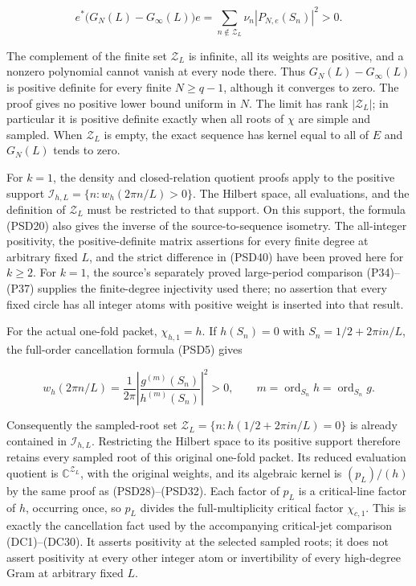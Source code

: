 \[
e^*\bigl(G_N(L)-G_\infty(L)\bigr)e
=\sum_{n\notin\mathcal Z_L}\nu_n|P_{N,e}(S_n)|^2>0.
\tag{PSD40}
\]

The complement of the finite set \(\mathcal Z_L\) is infinite, all its weights are positive, and a nonzero polynomial cannot vanish at every node there. Thus \(G_N(L)-G_\infty(L)\) is positive definite for every finite \(N\ge q-1\), although it converges to zero. The proof gives no positive lower bound uniform in \(N\). The limit has rank \(|\mathcal Z_L|\); in particular it is positive definite exactly when all roots of \(\chi\) are simple and sampled. When \(\mathcal Z_L\) is empty, the exact sequence has kernel equal to all of \(E\) and \(G_N(L)\) tends to zero.

For \(k=1\), the density and closed-relation quotient proofs apply to the positive support \(\mathcal I_{h,L}=\{n:w_h(2\pi n/L)>0\}\). The Hilbert space, all evaluations, and the definition of \(\mathcal Z_L\) must be restricted to that support. On this support, the formula (PSD20) also gives the inverse of the source-to-sequence isometry. The all-integer positivity, the positive-definite matrix assertions for every finite degree at arbitrary fixed \(L\), and the strict difference in (PSD40) have been proved here for \(k\ge2\). For \(k=1\), the source's separately proved large-period comparison (P34)--(P37) supplies the finite-degree injectivity used there; no assertion that every fixed circle has all integer atoms with positive weight is inserted into that result.

For the actual one-fold packet, \(\chi_{h,1}=h\). If \(h(S_n)=0\) with \(S_n=1/2+2\pi i n/L\), the full-order cancellation formula (PSD5) gives

\[
w_h(2\pi n/L)=\frac1{2\pi}
\left|\frac{g^{(m)}(S_n)}{h^{(m)}(S_n)}\right|^2>0,
\qquad m=\operatorname{ord}_{S_n}h=\operatorname{ord}_{S_n}g.
\tag{PSD41}
\]

Consequently the sampled-root set \(\mathcal Z_L=\{n:h(1/2+2\pi i n/L)=0\}\) is already contained in \(\mathcal I_{h,L}\). Restricting the Hilbert space to its positive support therefore retains every sampled root of this original one-fold packet. Its reduced evaluation quotient is \(\mathbb C^{\mathcal Z_L}\), with the original weights, and its algebraic kernel is \((p_L)/(h)\) by the same proof as (PSD28)--(PSD32). Each factor of \(p_L\) is a critical-line factor of \(h\), occurring once, so \(p_L\) divides the full-multiplicity critical factor \(\chi_{c,1}\). This is exactly the cancellation fact used by the accompanying critical-jet comparison (DC1)--(DC30). It asserts positivity at the selected sampled roots; it does not assert positivity at every other integer atom or invertibility of every high-degree Gram at arbitrary fixed \(L\).
